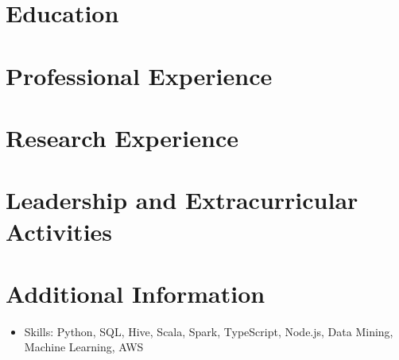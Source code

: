 \documentclass{resumeEN}
\begin{document}
\section{Education}

\pennmaster
\thuundergrad

\section{Professional Experience}

\amazon
\msra
\bytedance

\section{Research Experience}

\ryanresearch

\section{Leadership and Extracurricular Activities}

\eydatascience
\cnkibibtex

\section{Additional Information}

\vspace{0.618ex}
\begin{itemize}
\item Skills: Python, SQL, Hive, Scala, Spark, TypeScript, Node.js, Data Mining, Machine Learning, AWS
\end{itemize}
\end{document}
